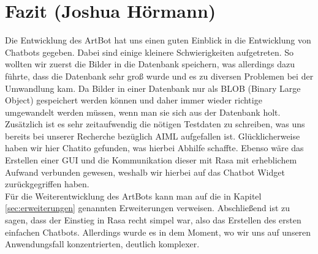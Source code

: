 \section{Fazit (Joshua Hörmann)}
Die Entwicklung des ArtBot hat uns einen guten Einblick in die Entwicklung von Chatbots gegeben. Dabei sind einige kleinere Schwierigkeiten aufgetreten. So wollten wir zuerst die Bilder in die Datenbank speichern, was allerdings dazu führte, dass die Datenbank sehr groß wurde und es zu diversen Problemen bei der Umwandlung kam. Da Bilder in einer Datenbank nur als BLOB (Binary Large Object) gespeichert werden können und daher immer wieder richtige umgewandelt werden müssen, wenn man sie sich aus der Datenbank holt. Zusätzlich ist es sehr zeitaufwendig die nötigen Testdaten zu schreiben, was uns bereits bei unserer Recherche bezüglich AIML aufgefallen ist. Glücklicherweise haben wir hier Chatito gefunden, was hierbei Abhilfe schaffte. Ebenso wäre das Erstellen einer GUI und die Kommunikation dieser mit Rasa mit erheblichem Aufwand verbunden gewesen, weshalb wir hierbei auf das Chatbot Widget zurückgegriffen haben. \\
Für die Weiterentwicklung des ArtBots kann man auf die in Kapitel \ref{sec:erweiterungen} genannten Erweiterungen verweisen. Abschließend ist zu sagen, dass der Einstieg in Rasa recht simpel war, also das Erstellen des ersten einfachen Chatbots. Allerdings wurde es in dem Moment, wo wir uns auf unseren Anwendungsfall konzentrierten, deutlich komplexer.